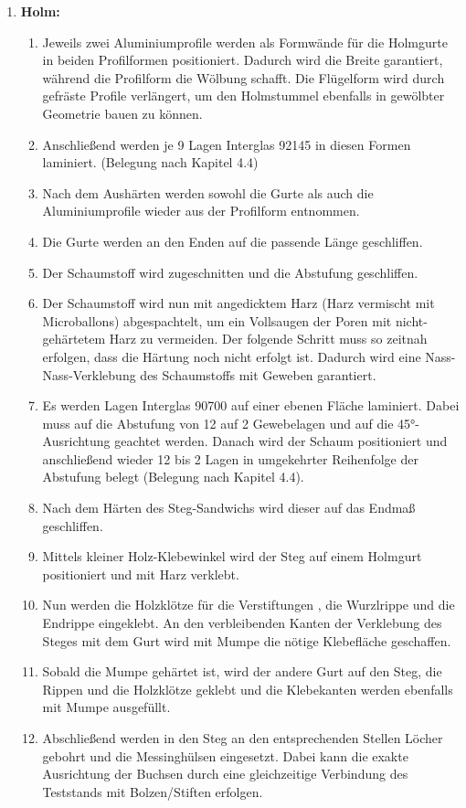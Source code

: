 \begin{enumerate}
	\item \textbf{Holm:}
	\begin{enumerate}
		\item Jeweils zwei Aluminiumprofile werden als Formwände für die Holmgurte in beiden Profilformen positioniert. Dadurch wird die Breite garantiert, während die Profilform die Wölbung schafft. Die Flügelform wird durch gefräste Profile verlängert, um den Holmstummel ebenfalls in gewölbter Geometrie bauen zu können. 
		\item Anschließend werden je 9 Lagen Interglas 92145 in diesen Formen laminiert. (Belegung nach Kapitel  4.4) 
		\item Nach dem Aushärten werden sowohl die Gurte als auch die Aluminiumprofile wieder aus der Profilform entnommen. 
		\item Die Gurte werden an den Enden auf die passende Länge geschliffen.
		\item Der Schaumstoff wird zugeschnitten und die Abstufung geschliffen.
		\item Der Schaumstoff wird nun mit angedicktem Harz (Harz vermischt mit Microballons) \glqq abgespachtelt\grqq, um ein Vollsaugen der Poren mit nicht-gehärtetem Harz zu vermeiden. Der folgende Schritt muss so zeitnah erfolgen, dass die Härtung noch nicht erfolgt ist. Dadurch wird eine Nass-Nass-Verklebung des Schaumstoffs mit Geweben garantiert.
		\item Es werden Lagen Interglas 90700 auf einer ebenen Fläche laminiert. Dabei muss auf die Abstufung von 12 auf 2 Gewebelagen und auf die 45°-Ausrichtung geachtet werden. Danach wird der Schaum positioniert und anschließend wieder 12 bis 2 Lagen in umgekehrter Reihenfolge der Abstufung belegt (Belegung nach Kapitel 4.4).
		\item Nach dem Härten des Steg-Sandwichs wird dieser auf das Endmaß geschliffen.
		\item Mittels kleiner Holz-Klebewinkel wird der Steg auf einem Holmgurt positioniert und mit Harz verklebt.
		\item Nun werden die Holzklötze für die Verstiftungen , die Wurzlrippe und die Endrippe eingeklebt. An den verbleibenden Kanten der Verklebung des Steges mit dem Gurt wird mit Mumpe die nötige Klebefläche geschaffen.
		\item Sobald die Mumpe gehärtet ist, wird der andere Gurt auf den Steg, die Rippen und die Holzklötze geklebt und die Klebekanten werden ebenfalls mit Mumpe ausgefüllt.
		\item Abschließend werden in den Steg an den entsprechenden Stellen Löcher gebohrt und die Messinghülsen eingesetzt. Dabei kann die exakte Ausrichtung der Buchsen durch eine gleichzeitige Verbindung des Teststands mit Bolzen/Stiften erfolgen.

\end{enumerate}
\end{enumerate}
